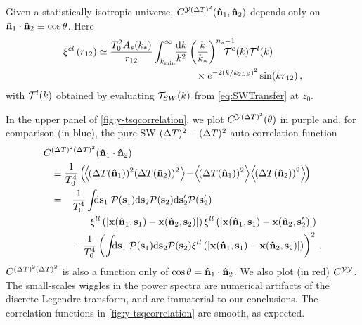 \documentclass[fleqn,usenatbib]{mnras}
\begin{document}
    Given a statistically isotropic universe, $C^{\mathcal{Y}(\Delta
    T)^2}(\mathbf{{\bf\hat{n}}}_1,\mathbf{{\bf\hat{n}}}_2)$ depends only on
    ${\bf\hat{n}}_1\cdot{\bf\hat{n}}_2\equiv\cos\theta$.  Here
    \begin{align}\label{eqn:xiearlylateofdeltar}
        \xi^{el}\left(r_{12} \right)
        &\simeq
            \frac{T_0^2 A_s(k_*)}{r_{12}}
               \int_{k_{\rm min}}^{\infty} \!\! \frac{\dif{k}}{k^2}
                    \left(\frac{k}{k_*}\right)^{n_s-1}
                    \!\!\!\!\!\!\!\! \mcal{T}^{e}(k)
                    \mcal{T}^{l}(k) \\
            &\qquad \qquad \qquad \qquad \qquad \times
                \Exp{-2 (k/k_{2LS})^2} \sin(k r_{12})   \,,\nonumber
    \end{align}
    with ${\cal{T}}^l(k) $ obtained by evaluating ${\cal{T}}_{SW}(k)$ from
    \eqref{eq:SWTransfer} at $z_0$.

    In the upper panel of \autoref{fig:y-tsqcorrelation}, we plot
    $C^{\mathcal{Y}({\Delta T})^2}(\theta)$ in purple and, for comparison (in blue), the
    pure-SW $({\Delta T})^2-({\Delta T})^2$ auto-correlation function
    \begin{align}
        C&^{(\DeltaT)^2 (\DeltaT)^2}(\mbf{\nhat}_1\cdot\mbf{\nhat}_2) \nonumber
        \\
        &\equiv
            \frac{1}{T_0^4}
            \left(\!
                \Big\langle \!(\DeltaT(\nhat_1))^2(\DeltaT(\nhat_2))^2 \Big\rangle
                \!-\! \Big\langle\!(\DeltaT(\nhat_1))^2\Big\rangle \Big\langle\!(\DeltaT(\nhat_2))^2 \Big\rangle
            \!\right)
        \\
        &=
            \phantom{+}\frac{1}{T_0^4}
            \int\!\!\! \dif{\mbf{s}_1} \; \mcal{P}(\mbf{s}_1) \dif{\mbf{s}_2} \mcal{P}(\mbf{s}_2) \dif{\mbf{s}'_2} \mcal{P}(\mbf{s}'_2)
            \\
            &\qquad\qquad
                \xi^{ll}\left(\norm{ \mbf{x}(\nhat_1,\mbf{s}_1) - \mbf{x}(\nhat_2,\mbf{s}_2) }\right)
                \xi^{ll}\left(\norm{ \mbf{x}(\nhat_1,\mbf{s}_1) - \mbf{x}(\nhat_2,\mbf{s}'_2) }\right) \nonumber
            \\ &\qquad
                    - \frac{1}{T_0^4} \left( \int\!\!\! \dif{\mbf{s}_1} \; \mcal{P}(\mbf{s}_1) \dif{\mbf{s}_2} \mcal{P}(\mbf{s}_2)
                        \xi^{ll}\left(\norm{\mbf{x}(\nhat_1,\mbf{s}_1) - \mbf{x}(\nhat_2,\mbf{s}_2) }\right)
                        \right)^2
                    \nonumber\,.
    \end{align}
    $C^{({\Delta T})^2({\Delta T})^2}$ is also a function only of
    $\cos\theta={\bf\hat{n}}_1\cdot{\bf\hat{n}}_2$.
    We also plot (in red) $C^{\mathcal{Y}\mathcal{Y}}$.  The small-scales wiggles in the power
    spectra are numerical artifacts of the discrete Legendre transform, and are
    immaterial to our conclusions.  The correlation functions in
    \autoref{fig:y-tsqcorrelation} are smooth, as expected.
\end{document}
